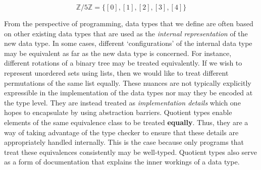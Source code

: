 \documentclass[12pt,twoside,maitrise]{dms}
\theoremstyle{definition}
\numberwithin{equation}{section}
\numberwithin{table}{chapter}
\numberwithin{figure}{chapter}
\begin{document}
\begin{equation}
\mathbb{Z} / 5\mathbb{Z} = \{ [0], [1], [2], [3], [4] \}
\end{equation}




From the perspective of programming, data types that we define are often based
on other existing data types that are used as the \emph{internal representation}
of the new data type. In some cases, different `configurations' of the internal
data type may be equivalent as far as the new data type is concerned. For
instance, different rotations of a binary tree may be treated equivalently. If
we wish to represent unordered sets using lists, then we would like to treat
different permutations of the same list equally. These nuances are not typically
explicitly expressible in the implementation of the data types nor may they be
encoded at the type level. They are instead treated as \emph{implementation
details} which one hopes to encapsulate by using abstraction barriers. Quotient
types enable elements of the same equivalence class to be treated
\textbf{equally}. Thus, they are a way of taking advantage of the type checker
to ensure that these details are appropriately handled internally. This is the
case because only programs that treat these equivalences consistently may be
well-typed. Quotient types also serve as a form of documentation that explains
the inner workings of a data type.
\end{document}
